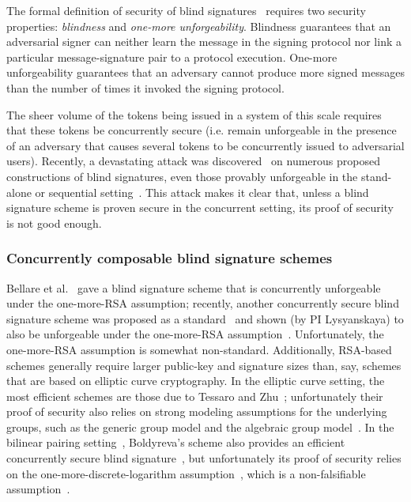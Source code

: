 The formal definition of security of blind signatures~\cite{JC:PoiSte00,C:JueLubOst97,RSA:AbdNamNev06,JC:SchUnr17} requires two security properties: \emph{blindness} and \emph{one-more unforgeability}. Blindness guarantees that an adversarial signer can neither learn the message in the signing protocol nor link a particular message-signature pair to a protocol execution.  One-more unforgeability guarantees that an adversary cannot produce more signed messages than the number of times it invoked the signing protocol.  

The sheer volume of the tokens being issued in a system of this scale requires that these tokens be concurrently secure (i.e. remain unforgeable in the presence of an adversary that causes several tokens to be concurrently issued to adversarial users). Recently, a devastating attack was discovered~\cite{EC:BLLOR21} on numerous proposed constructions of blind signatures, even those provably unforgeable in the stand-alone or sequential setting~\cite{C:Okamoto92,ICICS:Schnorr01,C:AbeOka00,C:Brands93,paquin2013u-prove,CCS:BalLys13,SP:STVWJG16,cryptoeprint:2017:682,JC:GJKR07}.  This attack makes it clear that, unless a blind signature scheme is proven secure in the concurrent setting, its proof of security is not good enough.

\subsubsection{Concurrently composable blind signature schemes}  
\label{rg1:blindsigs}

Bellare et al.~\cite{JC:BNPS03} gave a blind signature scheme that is concurrently unforgeable under the one-more-RSA assumption; recently, another concurrently secure blind signature scheme was proposed as a standard~\cite{ietf:djw21,ietf:djw22} and shown (by PI Lysyanskaya) to also be unforgeable under the one-more-RSA assumption~\cite{EPRINT:Lysyanskaya22}.  Unfortunately, the one-more-RSA assumption is somewhat non-standard.  Additionally, RSA-based schemes generally require larger public-key and signature sizes than, say, schemes that are based on elliptic curve cryptography.  In the elliptic curve setting, the most efficient schemes are those due to Tessaro and Zhu~\cite{EC:TesZhu22}; unfortunately their proof of security also relies on strong modeling assumptions for the underlying groups, such as the generic group model and the algebraic group model~\cite{C:FucKilLos18,EC:Shoup97}.  In the bilinear pairing setting~\cite{C:BonFra01}, Boldyreva's scheme also provides an efficient concurrently secure blind signature~\cite{PKC:Boldyreva03}, but unfortunately its proof of security relies on the one-more-discrete-logarithm assumption~\cite{C:BelPal02}, which is a non-falsifiable assumption~\cite{C:Naor03}.  

